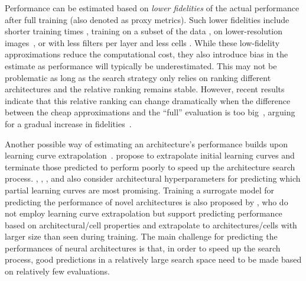\documentclass[twoside,11pt]{article}
\renewcommand{\cite}[1]{\citep{#1}}
\begin{document}
Performance can be estimated based on \emph{lower fidelities} of the actual performance after full training (also denoted as proxy metrics). Such lower fidelities include shorter training times \cite{DBLP:journals/corr/ZophVSL17,Zela_AutoML2018}, training on a subset of the data \cite{pmlr-v54-klein17a}, on lower-resolution images~\cite{Chrabaszcz_arXiv17}, or with less filters per layer and less cells \cite{DBLP:journals/corr/ZophVSL17,real_regularized_2018}. While these low-fidelity approximations reduce the computational cost, they also introduce bias in the estimate as performance will typically be underestimated. This may not be problematic as long as the search strategy only relies on ranking different architectures and the relative ranking remains stable. However, recent results indicate that this relative ranking can change dramatically when the difference between the cheap approximations and the ``full'' evaluation is too big~\cite{Zela_AutoML2018}, arguing for a gradual increase in fidelities~\cite{hyperband,pmlr-v80-falkner18a}.

Another possible way of estimating an architecture's performance builds upon learning curve extrapolation~\cite{swersky_freezethaw_2014,DomSprHut15,klein-iclr17,baker_accelerating_2017,rawal_nodes_2018}.
\citet{DomSprHut15} propose to extrapolate initial learning curves and terminate those predicted to perform poorly to speed up the architecture search process. \citet{swersky_freezethaw_2014}, \citet{klein-iclr17}, \citet{baker_accelerating_2017}, and \citet{rawal_nodes_2018} also consider architectural hyperparameters for predicting which partial learning curves are most promising. 
Training a surrogate model for predicting the performance of novel architectures is also proposed by \citet{liu_progressive_2017}, who do not employ learning curve extrapolation but support predicting performance based on architectural/cell properties and extrapolate to architectures/cells with larger size than seen during training. The main challenge for predicting the performances of neural architectures is that, in order to speed up the search process, good predictions in a relatively large search space need to be made based on relatively few evaluations. 
\end{document}
